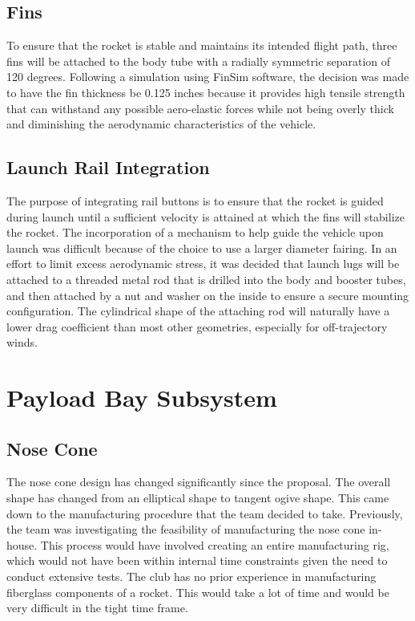     \subsection{Fins}
To ensure that the rocket is stable and maintains its intended flight path, three fins will be attached to the body tube with a radially symmetric separation of 120 degrees. Following a simulation using FinSim software, the decision was made to have the fin thickness be 0.125 inches because it provides high tensile strength that can withstand any possible aero-elastic forces while not being overly thick and diminishing the aerodynamic characteristics of the vehicle. 


    \subsection{Launch Rail Integration}
The purpose of integrating rail buttons is to ensure that the rocket is guided during launch until a sufficient velocity is attained at which the fins will stabilize the rocket. The incorporation of a mechanism to help guide the vehicle upon launch was difficult because of the choice to use a larger diameter fairing. In an effort to limit excess aerodynamic stress, it was decided that launch lugs will be attached to a threaded metal rod that is drilled into the body and booster tubes, and then attached by a nut and washer on the inside to ensure a secure mounting configuration. The cylindrical shape of the attaching rod will naturally have a lower drag coefficient than most other geometries, especially for off-trajectory winds.


\section{Payload Bay Subsystem}

    \subsection{Nose Cone}
    The nose cone design has changed significantly since the proposal. The overall shape has changed from an elliptical shape to tangent ogive shape. This came down to the manufacturing procedure that the team decided to take. Previously, the team was investigating the feasibility of manufacturing the nose cone in-house. This process would have involved creating an entire manufacturing rig, which would not have been within internal time constraints given the need to conduct extensive tests. The club has no prior experience in manufacturing fiberglass components of a rocket. This would take a lot of time and would be very difficult in the tight time frame. 

